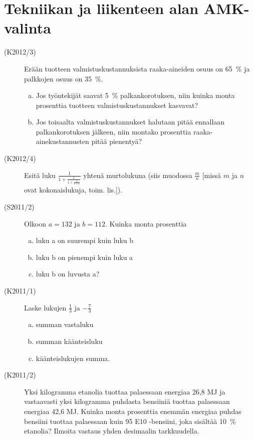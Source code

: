 \section{Tekniikan ja liikenteen alan AMK-valinta}

\begin{description}
	\item[(K2012/3)] Erään tuotteen valmistuskustannuksista raaka-aineiden osuus on
        65~\% ja palkkojen osuus on 35~\%.
        
    	\begin{enumerate}[(a)]
    		\item Jos työntekijät saavat 5~\% palkankorotuksen, niin kuinka monta
                prosenttia tuotteen valmistuskustannukset kasvavat?
    		\item Jos toisaalta valmistuskustannukset halutaan pitää ennallaan
                palkankorotuksen jälkeen, niin montako prosenttia raaka-ainekustannusten
                pitää pienentyä?
    	\end{enumerate}	 

	\item[(K2012/4)] Esitä luku $\frac{1}{1+\frac{1}{1+\frac{1}{1+1}}}$ yhtenä murtolukuna (siis muodossa $\frac{m}{n}$ [missä $m$ ja $n$ ovat kokonaislukuja, toim. lis.]).
	\item[(S2011/2)] Olkoon $a=132$ ja  $b=112$. Kuinka monta prosenttia 
		\begin{enumerate}[(a)]
			\item luku a on suurempi kuin luku b
			\item luku b on pienempi kuin luku a
			\item luku b on luvusta a? 
		\end{enumerate}
	\item[(K2011/1)] Laske lukujen $\frac{1}{3}$ ja $-\frac{7}{3}$
		\begin{enumerate}[(a)]
			\item summan vastaluku
			\item summan käänteisluku 
			\item käänteislukujen summa.
		\end{enumerate}
	\item[(K2011/2)] Yksi kilogramma etanolia tuottaa palaessaan energiaa 26,8 MJ
        ja vastaavasti yksi kilogramma puhdasta bensiiniä tuottaa palaessaan energiaa
        42,6 MJ. Kuinka monta prosenttia enemmän energiaa puhdas bensiini tuottaa
        palaessaan kuin 95 E10 -bensiini, joka sisältää 10~\% etanolia? Ilmoita
        vastaus yhden desimaalin tarkkuudella. 
\end{description}

